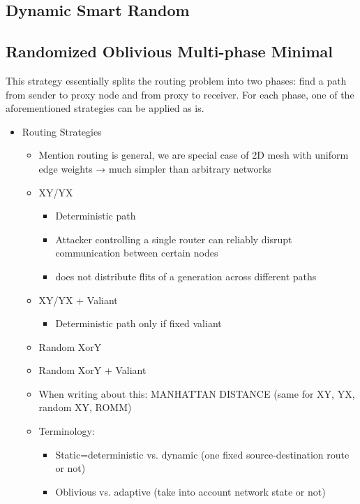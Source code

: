 \subsection{Dynamic Smart Random}
\subsection{Randomized Oblivious Multi-phase Minimal}
This strategy essentially splits the routing problem into two phases: find a path from sender to proxy node and from proxy to receiver. For each
phase, one of the aforementioned strategies can be applied as is.

\begin{itemize}
    \item Routing Strategies
        \begin{itemize}
            \item Mention routing is general, we are special case of 2D mesh with uniform edge weights → much simpler than arbitrary networks
            \item XY/YX
                \begin{itemize}
                    \item Deterministic path
                    \item Attacker controlling a single router can reliably disrupt communication between certain nodes
                    \item does not distribute flits of a generation across different paths
                \end{itemize}
            \item XY/YX + Valiant
                \begin{itemize}
                    \item Deterministic path only if fixed valiant
                \end{itemize}
            \item Random XorY
            \item Random XorY + Valiant
            \item When writing about this: MANHATTAN DISTANCE (same for XY, YX, random XY, ROMM)
            \item Terminology:
                \begin{itemize}
                    \item Static=deterministic vs. dynamic (one fixed source-destination route or not)
                    \item Oblivious vs. adaptive (take into account network state or not)

\end{itemize}
\end{itemize}
\end{itemize}
